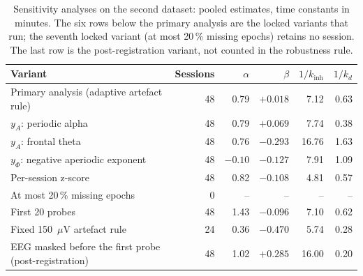 \documentclass[12pt,a4paper]{article}
\theoremstyle{plain}
\theoremstyle{definition}
\theoremstyle{remark}
\newcommand{\kinh}{k_{\mathrm{inh}}}
\newcommand{\kd}{k_{d}}
\begin{document}
\begin{table}[H]
\centering\footnotesize
\caption{Sensitivity analyses on the second dataset: pooled estimates, time constants in minutes. The six rows below the primary analysis are the locked variants that run; the seventh locked variant (at most 20\,\% missing epochs) retains no session. The last row is the post-registration variant, not counted in the robustness rule.}
\label{tab:osf-sens}
\setlength{\tabcolsep}{4pt}
\begin{tabular}{lrrrrr}
\toprule
Variant & Sessions & $\alpha$ & $\beta$ & $1/\kinh$ & $1/\kd$ \\
\midrule
Primary analysis (adaptive artefact rule) & 48 & 0.79 & $+0.018$ & 7.12 & 0.63 \\
\midrule
$y_A$: periodic alpha                     & 48 & 0.79 & $+0.069$ & 7.74 & 0.38 \\
$y_A$: frontal theta                      & 48 & 0.76 & $-0.293$ & 16.76 & 1.63 \\
$y_\Phi$: negative aperiodic exponent     & 48 & $-0.10$ & $-0.127$ & 7.91 & 1.09 \\
Per-session z-score                       & 48 & 0.82 & $-0.108$ & 4.81 & 0.57 \\
At most 20\,\% missing epochs             &  0 & -- & -- & -- & -- \\
First 20 probes                           & 48 & 1.43 & $-0.096$ & 7.10 & 0.62 \\
Fixed 150~$\mu$V artefact rule            & 24 & 0.36 & $-0.470$ & 5.74 & 0.28 \\
\midrule
EEG masked before the first probe (post-registration) & 48 & 1.02 & $+0.285$ & 16.00 & 0.20 \\
\bottomrule
\end{tabular}
\end{table}
\end{document}
